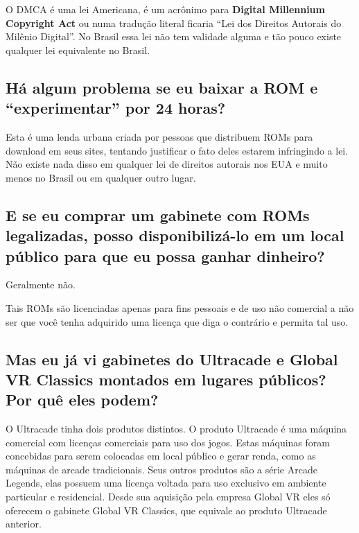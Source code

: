 \documentclass[letterpaper,10pt,brazil]{sphinxmanual}
\begin{document}
O DMCA é uma lei Americana, é um acrônimo para \textbf{Digital Millennium
Copyright Act} ou numa tradução literal ficaria ``Lei dos Direitos
Autorais do Milênio Digital''.
No Brasil essa lei não tem validade alguma e tão pouco existe qualquer
lei equivalente no Brasil.


\subsection{Há algum problema se eu baixar a ROM e ``experimentar'' por 24 horas?}
\label{usingmame/commonissues:hours}\label{usingmame/commonissues:ha-algum-problema-se-eu-baixar-a-rom-e-experimentar-por-24-horas}
Esta é uma lenda urbana criada por pessoas que distribuem ROMs para
download em seus sites, tentando justificar o fato deles estarem
infringindo a lei. Não existe nada disso em qualquer lei de direitos
autorais nos EUA e muito menos no Brasil ou em qualquer outro lugar.


\subsection{E se eu comprar um gabinete com ROMs legalizadas, posso disponibilizá-lo em um local público para que eu possa ganhar dinheiro?}
\label{usingmame/commonissues:commercial-use}\label{usingmame/commonissues:e-se-eu-comprar-um-gabinete-com-roms-legalizadas-posso-disponibiliza-lo-em-um-local-publico-para-que-eu-possa-ganhar-dinheiro}
Geralmente não.

Tais ROMs são licenciadas apenas para fins pessoais e de uso não
comercial a não ser que você tenha adquirido uma licença que diga o
contrário e permita tal uso.


\subsection{Mas eu já vi gabinetes do Ultracade e Global VR Classics montados em lugares públicos? Por quê eles podem?}
\label{usingmame/commonissues:ultracade}\label{usingmame/commonissues:mas-eu-ja-vi-gabinetes-do-ultracade-e-global-vr-classics-montados-em-lugares-publicos-por-que-eles-podem}
O Ultracade tinha dois produtos distintos. O produto Ultracade é uma
máquina comercial com licenças comerciais para uso dos jogos.
Estas máquinas foram concebidas para serem colocadas em local público
e gerar renda, como as máquinas de arcade tradicionais. Seus outros
produtos são a série Arcade Legends, elas possuem uma licença voltada
para uso exclusivo em ambiente particular e residencial.
Desde sua aquisição pela empresa Global VR eles só oferecem o gabinete
Global VR Classics, que equivale ao produto Ultracade anterior.
\end{document}

